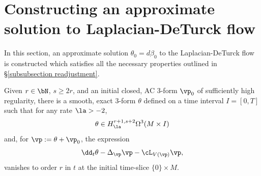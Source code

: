 \documentclass[hidelinks, 12pt, oneside, reqno]{amsart}
\begin{document}
\section{Constructing an approximate solution to Laplacian-DeTurck flow}\label{section approximate solution}

In this section, an approximate solution $\theta_0 = d\beta_0$ to the Laplacian-DeTurck flow is constructed which satisfies all the necessary properties outlined in \S \ref{subsubsection readjustment}.

\begin{lem}\label{lemma approximate solution}
    Given $r \in \bN$, $s \ge 2r$, and an initial closed, AC 3-form $\vp_0$ of sufficiently high regularity, there is a smooth, exact 3-form $\theta$ defined on a time interval $I = [0,T]$ such that for any rate $\la > -2$,
    \[
    \theta \in H^{r+1,s+2}_{\la}\Omega^3(M \times I) 
    \]
    and, for $\vp := \theta + \vp_0$, the expression
    \[
    \dd_t \theta - \Delta_{\vp} \vp - \cL_{V(\vp)}\vp,
    \]
    vanishes to order $r$ in $t$ at the initial time-slice $\{0\} \times M$.  
\end{lem}
\end{document}
